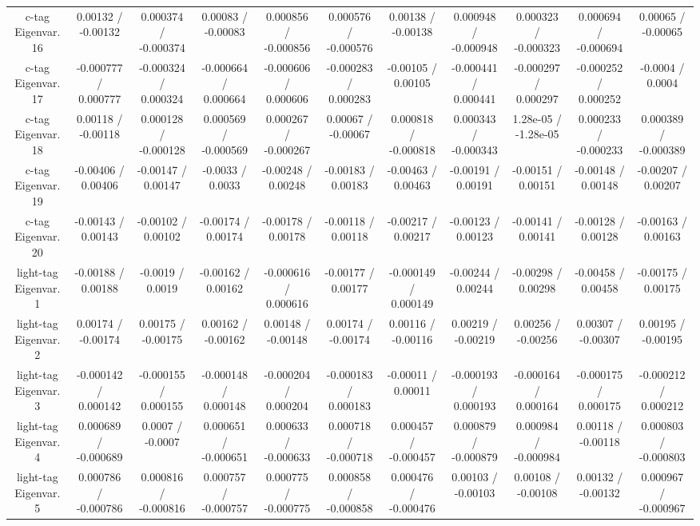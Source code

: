\begin{table}[htbp]
\begin{center}
\begin{tabular}{|c|c|c|c|c|c|c|c|c|c|c|}
  c-tag Eigenvar. 16 & 0.00132 / -0.00132 & 0.000374 / -0.000374 & 0.00083 / -0.00083 & 0.000856 / -0.000856 & 0.000576 / -0.000576 & 0.00138 / -0.00138 & 0.000948 / -0.000948 & 0.000323 / -0.000323 & 0.000694 / -0.000694 & 0.00065 / -0.00065 \\ 
  c-tag Eigenvar. 17 & -0.000777 / 0.000777 & -0.000324 / 0.000324 & -0.000664 / 0.000664 & -0.000606 / 0.000606 & -0.000283 / 0.000283 & -0.00105 / 0.00105 & -0.000441 / 0.000441 & -0.000297 / 0.000297 & -0.000252 / 0.000252 & -0.0004 / 0.0004 \\ 
  c-tag Eigenvar. 18 & 0.00118 / -0.00118 & 0.000128 / -0.000128 & 0.000569 / -0.000569 & 0.000267 / -0.000267 & 0.00067 / -0.00067 & 0.000818 / -0.000818 & 0.000343 / -0.000343 & 1.28e-05 / -1.28e-05 & 0.000233 / -0.000233 & 0.000389 / -0.000389 \\ 
  c-tag Eigenvar. 19 & -0.00406 / 0.00406 & -0.00147 / 0.00147 & -0.0033 / 0.0033 & -0.00248 / 0.00248 & -0.00183 / 0.00183 & -0.00463 / 0.00463 & -0.00191 / 0.00191 & -0.00151 / 0.00151 & -0.00148 / 0.00148 & -0.00207 / 0.00207 \\ 
  c-tag Eigenvar. 20 & -0.00143 / 0.00143 & -0.00102 / 0.00102 & -0.00174 / 0.00174 & -0.00178 / 0.00178 & -0.00118 / 0.00118 & -0.00217 / 0.00217 & -0.00123 / 0.00123 & -0.00141 / 0.00141 & -0.00128 / 0.00128 & -0.00163 / 0.00163 \\ 
  light-tag Eigenvar. 1 & -0.00188 / 0.00188 & -0.0019 / 0.0019 & -0.00162 / 0.00162 & -0.000616 / 0.000616 & -0.00177 / 0.00177 & -0.000149 / 0.000149 & -0.00244 / 0.00244 & -0.00298 / 0.00298 & -0.00458 / 0.00458 & -0.00175 / 0.00175 \\ 
  light-tag Eigenvar. 2 & 0.00174 / -0.00174 & 0.00175 / -0.00175 & 0.00162 / -0.00162 & 0.00148 / -0.00148 & 0.00174 / -0.00174 & 0.00116 / -0.00116 & 0.00219 / -0.00219 & 0.00256 / -0.00256 & 0.00307 / -0.00307 & 0.00195 / -0.00195 \\ 
  light-tag Eigenvar. 3 & -0.000142 / 0.000142 & -0.000155 / 0.000155 & -0.000148 / 0.000148 & -0.000204 / 0.000204 & -0.000183 / 0.000183 & -0.00011 / 0.00011 & -0.000193 / 0.000193 & -0.000164 / 0.000164 & -0.000175 / 0.000175 & -0.000212 / 0.000212 \\ 
  light-tag Eigenvar. 4 & 0.000689 / -0.000689 & 0.0007 / -0.0007 & 0.000651 / -0.000651 & 0.000633 / -0.000633 & 0.000718 / -0.000718 & 0.000457 / -0.000457 & 0.000879 / -0.000879 & 0.000984 / -0.000984 & 0.00118 / -0.00118 & 0.000803 / -0.000803 \\ 
  light-tag Eigenvar. 5 & 0.000786 / -0.000786 & 0.000816 / -0.000816 & 0.000757 / -0.000757 & 0.000775 / -0.000775 & 0.000858 / -0.000858 & 0.000476 / -0.000476 & 0.00103 / -0.00103 & 0.00108 / -0.00108 & 0.00132 / -0.00132 & 0.000967 / -0.000967 \\ 

\end{tabular}
\end{center}
\end{table}
